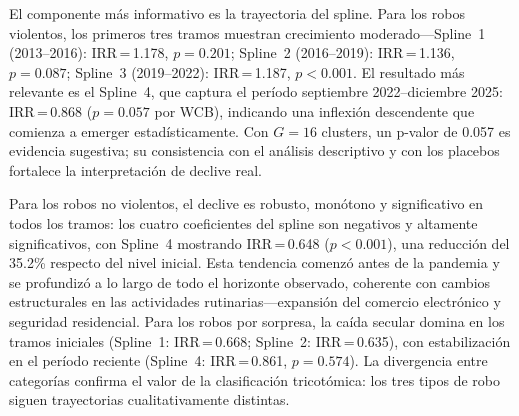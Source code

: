 \documentclass[12pt,a4paper]{article}
\begin{document}
El componente m\'as informativo es la trayectoria del spline. Para los robos violentos,
los primeros tres tramos muestran crecimiento moderado---Spline~1 (2013--2016):
IRR\,=\,1.178, $p=0.201$; Spline~2 (2016--2019): IRR\,=\,1.136, $p=0.087$;
Spline~3 (2019--2022): IRR\,=\,1.187, $p<0.001$. El resultado m\'as relevante es el
Spline~4, que captura el per\'iodo septiembre 2022--diciembre 2025: IRR\,=\,0.868
($p=0.057$ por WCB), indicando una inflexi\'on descendente que comienza a emerger
estad\'isticamente. Con $G=16$ clusters, un p-valor de 0.057 es evidencia sugestiva;
su consistencia con el an\'alisis descriptivo y con los placebos fortalece la
interpretaci\'on de declive real.

Para los robos no violentos, el declive es robusto, mon\'otono y significativo en todos
los tramos: los cuatro coeficientes del spline son negativos y altamente significativos,
con Spline~4 mostrando IRR\,=\,0.648 ($p<0.001$), una reducci\'on del 35.2\% respecto
del nivel inicial. Esta tendencia comenz\'o antes de la pandemia y se profundiz\'o a lo
largo de todo el horizonte observado, coherente con cambios estructurales en las
actividades rutinarias---expansi\'on del comercio electr\'onico y seguridad residencial.
Para los robos por sorpresa, la ca\'ida secular domina en los tramos iniciales
(Spline~1: IRR\,=\,0.668; Spline~2: IRR\,=\,0.635), con estabilizaci\'on en el per\'iodo
reciente (Spline~4: IRR\,=\,0.861, $p=0.574$). La divergencia entre categor\'ias
confirma el valor de la clasificaci\'on tricot\'omica: los tres tipos de robo siguen
trayectorias cualitativamente distintas.
\end{document}
